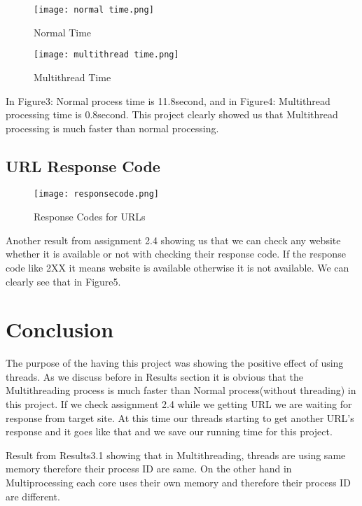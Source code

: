 \documentclass[onecolumn]{article}
\begin{document}
\begin{figure}[h]
    \centering
    \texttt{[image: normal time.png]}
    \caption{Normal Time}
    \label{fig:normal time}
     \centering
    \texttt{[image: multithread time.png]}
    \caption{Multithread Time}
    \label{fig:multithread time}
\end{figure}




In Figure3: Normal process time is 11.8second, and in Figure4: Multithread processing time is 0.8second. This project clearly showed us that Multithread processing is much faster than normal processing. 


\subsection{URL Response Code}
\begin{figure}[h]
    \centering
    \texttt{[image: responsecode.png]}
    \caption{Response Codes for URLs}
    \label{fig:normal time}
\end{figure}

Another result from assignment 2.4 showing us that we can check any website whether it is available or not with checking their response code. If the response code like 2XX it means website is available otherwise it is not available. We can clearly see that in Figure5.


\section{Conclusion}

The purpose of the having this project was showing the positive effect of using threads. As we discuss before in Results section it is obvious that the Multithreading process is much faster than Normal process(without threading) in this project. If we check assignment 2.4 while we getting URL we are waiting for response from target site. At this time our threads starting to get another URL's response and it goes like that and we save our running time for this project.

Result from Results3.1 showing that in Multithreading, threads are using same memory therefore their process ID are same. On the other hand in Multiprocessing each core uses their own memory and therefore their process ID are different.
\end{document}
